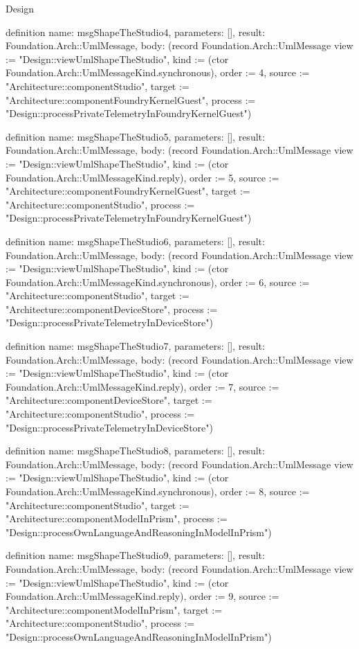 \begin{lexlean}{Design}
\begin{semanticmodule}
definition{
  name: msgShapeTheStudio4,
  parameters: [],
  result: Foundation.Arch::UmlMessage,
  body: (record Foundation.Arch::UmlMessage {view := "Design::viewUmlShapeTheStudio", kind := (ctor Foundation.Arch::UmlMessageKind.synchronous), order := 4, source := "Architecture::componentStudio", target := "Architecture::componentFoundryKernelGuest", process := "Design::processPrivateTelemetryInFoundryKernelGuest"})
}

definition{
  name: msgShapeTheStudio5,
  parameters: [],
  result: Foundation.Arch::UmlMessage,
  body: (record Foundation.Arch::UmlMessage {view := "Design::viewUmlShapeTheStudio", kind := (ctor Foundation.Arch::UmlMessageKind.reply), order := 5, source := "Architecture::componentFoundryKernelGuest", target := "Architecture::componentStudio", process := "Design::processPrivateTelemetryInFoundryKernelGuest"})
}

definition{
  name: msgShapeTheStudio6,
  parameters: [],
  result: Foundation.Arch::UmlMessage,
  body: (record Foundation.Arch::UmlMessage {view := "Design::viewUmlShapeTheStudio", kind := (ctor Foundation.Arch::UmlMessageKind.synchronous), order := 6, source := "Architecture::componentStudio", target := "Architecture::componentDeviceStore", process := "Design::processPrivateTelemetryInDeviceStore"})
}

definition{
  name: msgShapeTheStudio7,
  parameters: [],
  result: Foundation.Arch::UmlMessage,
  body: (record Foundation.Arch::UmlMessage {view := "Design::viewUmlShapeTheStudio", kind := (ctor Foundation.Arch::UmlMessageKind.reply), order := 7, source := "Architecture::componentDeviceStore", target := "Architecture::componentStudio", process := "Design::processPrivateTelemetryInDeviceStore"})
}

definition{
  name: msgShapeTheStudio8,
  parameters: [],
  result: Foundation.Arch::UmlMessage,
  body: (record Foundation.Arch::UmlMessage {view := "Design::viewUmlShapeTheStudio", kind := (ctor Foundation.Arch::UmlMessageKind.synchronous), order := 8, source := "Architecture::componentStudio", target := "Architecture::componentModelInPrism", process := "Design::processOwnLanguageAndReasoningInModelInPrism"})
}

definition{
  name: msgShapeTheStudio9,
  parameters: [],
  result: Foundation.Arch::UmlMessage,
  body: (record Foundation.Arch::UmlMessage {view := "Design::viewUmlShapeTheStudio", kind := (ctor Foundation.Arch::UmlMessageKind.reply), order := 9, source := "Architecture::componentModelInPrism", target := "Architecture::componentStudio", process := "Design::processOwnLanguageAndReasoningInModelInPrism"})
}


\end{semanticmodule}
\end{lexlean}
